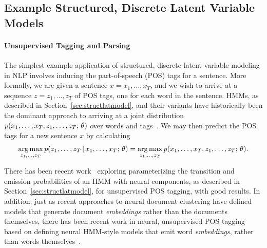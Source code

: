 \documentclass{article}
\begin{document}
\subsection{Example Structured, Discrete Latent Variable Models}
\paragraph{Unsupervised Tagging and Parsing}
The simplest example application of structured, discrete latent variable modeling in NLP involves inducing the part-of-speech (POS) tags for a sentence. More formally, we are given a sentence $x = x_1, \ldots, x_T$, and we wish to arrive at a sequence $z = z_1, \ldots, z_T$ of POS tags, one for each word in the sentence. HMMs, as described in Section~\ref{sec:structlatmodel}, and their variants have historically been the dominant approach to arriving at a joint distribution $p(x_1, \ldots, x_T, z_1, \ldots, z_T ; \, \theta)$ over words and tags~\citep{brown1992class,merialdo1994tagging,smith2005contrastive,haghighi2006prototype,johnson2007doesn,toutanova2008bayesian,kirk2010,christodoulopoulos2010two,blunsom2011hierarchical,stratos2016unsupervised}. We may then predict the POS tags for a new sentence $x$ by calculating
\begin{align*}
    \argmax_{z_1, \ldots, z_T} p(z_1, \ldots, z_T \given x_1, \ldots, x_T \param \theta) = \argmax_{z_1, \ldots, z_T} p(x_1, \ldots, x_T, z_1, \ldots, z_T \param \theta).
\end{align*}

There has been recent work~\citep{tran2016} exploring parameterizing the transition and emission probabilities of an HMM with neural components, as described in Section~\ref{sec:structlatmodel}, for unsupervised POS tagging, with good results. In addition, just as recent approaches to neural document clustering have defined models that generate document \textit{embeddings} rather than the documents themselves, there has been recent work in neural, unsupervised POS tagging based on defining neural HMM-style models that emit word \textit{embeddings}, rather than words themselves~\citep{lin2015unsupervised,he2018}.
\end{document}
